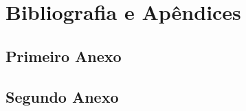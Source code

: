 \documentclass[english]{ist-thesis}
\begin{document}
\lipsum %

\nocite{latex-companion, fontcatalogue, latexwiki, ctan, texsx}

\part{Bibliografia e Apêndices}

\printbibliography[heading = bibintoc]

\appendix

\chapter{Primeiro Anexo}

\lipsum

\chapter{Segundo Anexo}

\lipsum

\makespine
\end{document}
